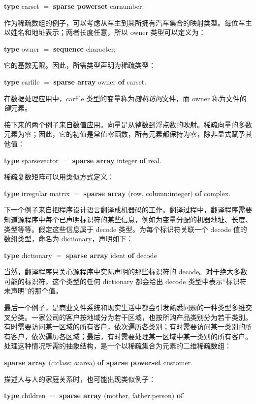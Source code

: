 \quad \textbf{type} carset $=$ \textbf{sparse powerset} carnumber;

作为稀疏数组的例子，可以考虑从车主到其所拥有汽车集合的映射类型。每位车主以姓名和地址表示；两者长度任意，所以 owner 类型可以定义为：

\quad \textbf{type} owner $=$ \textbf{sequence} character;

\noindent
它的基数无限。因此，所需类型声明为稀疏类型：

\quad \textbf{type} carfile $=$ \textbf{sparse array} owner \textbf{of} carset.

在数据处理应用中，carfile 类型的变量称为\textit{随机访问}文件，而 owner 称为文件的\textit{键}元素。

接下来的两个例子来自数值应用。向量是从整数到浮点数的映射。稀疏向量的多数元素为零；因此，它的初值是常值零函数，所有元素都保持为零，除非显式赋予其他值：

\quad \textbf{type} sparsevector $=$ \textbf{sparse array} integer \textbf{of} real.

\noindent
稀疏复数矩阵可以用类似方式定义：

\quad \textbf{type} irregular matrix $=$ \textbf{sparse array} $($row, column:integer$)$ \textbf{of} complex.

下一个例子来自把程序设计语言翻译成机器码的工作。翻译过程中，翻译程序需要知道源程序中每个已声明标识符的某些信息，例如为变量分配的机器地址、长度、类型等等。假定这些信息属于 decode 类型。为每个标识符关联一个 decode 值的数组类型，命名为 dictionary，声明如下：

\quad \textbf{type} dictionary $=$ \textbf{sparse array} ident \textbf{of} decode

\noindent
当然，翻译程序只关心源程序中实际声明的那些标识符的 decode。对于绝大多数可能的标识符，这个类型的任何 dictionary 都会给出 decode 类型中表示“标识符未声明”的那个值。

最后一个例子，是商业文件系统和现实生活中都会引发熟悉问题的一种类型\textemdash{}多维交叉分类。一家公司的客户按地域分为若干区域，也按所购产品类别分为若干类别。有时需要访问某一区域的所有客户，依次遍历各类别；有时需要访问某一类别的所有客户，依次遍历各区域；最后，有时需要处理某一区域中某一类别的所有客户。处理这种情况所需的抽象结构，是一个以稀疏集合为元素的二维稀疏数组：

\quad \textbf{sparse array} $(c$:class; $a$:area$)$ \textbf{of sparse powerset} customer.

描述人与人的家庭关系时，也可能出现类似例子：

\quad \textbf{type} children $=$ \textbf{sparse array} $($mother, father:person$)$ \textbf{of} 

